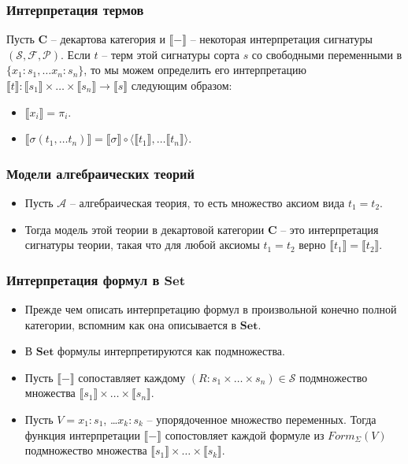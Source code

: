 \documentclass{beamer}
\theoremstyle{definition}
\newcommand{\cat}[1]{\mathbf{#1}}
\renewcommand{\C}{\cat{C}}
\newcommand{\Set}{\cat{Set}}
\renewcommand{\ll}{\llbracket}
\newcommand{\rr}{\rrbracket}
\begin{document}
\begin{frame}
\frametitle{Интерпретация термов}
Пусть $\C$ -- декартова категория и $\ll - \rr$ -- некоторая интерпретация сигнатуры $(\mathcal{S},\mathcal{F},\mathcal{P})$.
Если $t$ -- терм этой сигнатуры сорта $s$ со свободными переменными в $\{ x_1 : s_1, \ldots x_n : s_n \}$,
то мы можем определить его интерпретацию $\ll t \rr : \ll s_1 \rr \times \ldots \times \ll s_n \rr \to \ll s \rr$ следующим образом:
\begin{itemize}
\item $\ll x_i \rr = \pi_i$.
\item $\ll \sigma(t_1, \ldots t_n) \rr = \ll \sigma \rr \circ \langle \ll t_1 \rr, \ldots \ll t_n \rr \rangle$.
\end{itemize}
\end{frame}

\begin{frame}
\frametitle{Модели алгебраических теорий}
\begin{itemize}
\item Пусть $\mathcal{A}$ -- алгебраическая теория, то есть множество аксиом вида $t_1 = t_2$.
\item Тогда модель этой теории в декартовой категории $\C$ -- это интерпретация сигнатуры теории, такая что для любой аксиомы $t_1 = t_2$ верно $\ll t_1 \rr = \ll t_2 \rr$.
\end{itemize}
\end{frame}

\begin{frame}
\frametitle{Интерпретация формул в $\Set$}
\begin{itemize}
\item Прежде чем описать интерпретацию формул в произвольной конечно полной категории, вспомним как она описывается в $\Set$.
\item В $\Set$ формулы интерпретируются как подмножества.
\item Пусть $\ll - \rr$ сопоставляет каждому $(R : s_1 \times \ldots \times s_n) \in \mathcal{S}$ подмножество множества $\ll s_1 \rr \times \ldots \times \ll s_n \rr$.
\item Пусть $V = x_1 : s_1$, \ldots $x_k : s_k$ -- упорядоченное множество переменных.
Тогда функция интерпретации $\ll - \rr$ сопостовляет каждой формуле из $Form_\Sigma(V)$ подмножество множества $\ll s_1 \rr \times \ldots \times \ll s_k \rr$.
\end{itemize}
\end{frame}
\end{document}
